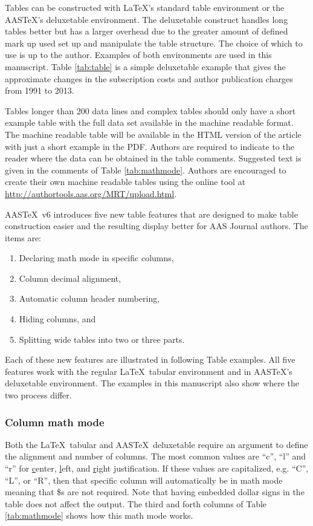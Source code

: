 \documentclass[preprint]{aastex62}
\newcommand\aastex{AAS\TeX}
\newcommand\latex{La\TeX}
\begin{document}
Tables can be constructed with \latex's standard table environment or the
\aastex's deluxetable environment. The deluxetable construct handles long
tables better but has a larger overhead due to the greater amount of
defined mark up used set up and manipulate the table structure.  The choice
of which to use is up to the author.  Examples of both environments are
used in this manuscript. Table \ref{tab:table} is a simple deluxetable
example that gives the approximate changes in the subscription costs and
author publication charges from 1991 to 2013.

Tables longer than 200 data lines and complex tables should only have a
short example table with the full data set available in the machine
readable format.  The machine readable table will be available in the HTML
version of the article with just a short example in the PDF. Authors are
required to indicate to the reader where the data can be obtained in the
table comments.  Suggested text is given in the comments of Table
\ref{tab:mathmode}.  Authors are encouraged to create their own machine
readable tables using the online tool at
\url{http://authortools.aas.org/MRT/upload.html}.

\aastex\ v6 introduces five new table features that are designed to make
table construction easier and the resulting display better for AAS Journal
authors.  The items are:

\begin{enumerate}
\item Declaring math mode in specific columns,
\item Column decimal alignment, 
\item Automatic column header numbering,
\item Hiding columns, and
\item Splitting wide tables into two or three parts.
\end{enumerate}

Each of these new features are illustrated in following Table examples.
All five features work with the regular \latex\ tabular environment and in
\aastex's deluxetable environment.  The examples in this manuscript also
show where the two process differ.

\subsubsection{Column math mode}

Both the \latex\ tabular and \aastex\ deluxetable require an argument to
define the alignment and number of columns.  The most common values are
``c'', ``l'' and ``r'' for \underline{c}enter, \underline{l}eft, and
\underline{r}ight justification.  If these values are capitalized, e.g.
``C'', ``L'', or ``R'', then that specific column will automatically be in math
mode meaning that \$s are not required.  Note that having embedded dollar
signs in the table does not affect the output.  The third and forth columns
of Table \ref{tab:mathmode} shows how this math mode works.
\end{document}
